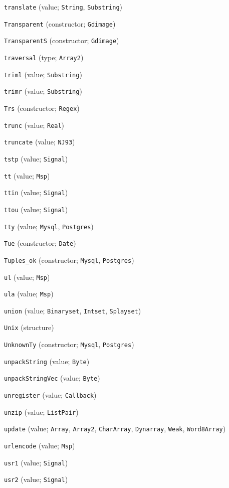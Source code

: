 \begin{description}
\item[] \verb"translate" (value; \verb"String", \verb"Substring")
\item[] \verb"Transparent" (constructor; \verb"Gdimage")
\item[] \verb"TransparentS" (constructor; \verb"Gdimage")
\item[] \verb"traversal" (type; \verb"Array2")
\item[] \verb"triml" (value; \verb"Substring")
\item[] \verb"trimr" (value; \verb"Substring")
\item[] \verb"Trs" (constructor; \verb"Regex")
\item[] \verb"trunc" (value; \verb"Real")
\item[] \verb"truncate" (value; \verb"NJ93")
\item[] \verb"tstp" (value; \verb"Signal")
\item[] \verb"tt" (value; \verb"Msp")
\item[] \verb"ttin" (value; \verb"Signal")
\item[] \verb"ttou" (value; \verb"Signal")
\item[] \verb"tty" (value; \verb"Mysql", \verb"Postgres")
\item[] \verb"Tue" (constructor; \verb"Date")
\item[] \verb"Tuples_ok" (constructor; \verb"Mysql", \verb"Postgres")
\\[2ex]

\item[] \verb"ul" (value; \verb"Msp")
\item[] \verb"ula" (value; \verb"Msp")
\item[] \verb"union" (value; \verb"Binaryset", \verb"Intset", \verb"Splayset")
\item[] \verb"Unix" (structure)
\item[] \verb"UnknownTy" (constructor; \verb"Mysql", \verb"Postgres")
\item[] \verb"unpackString" (value; \verb"Byte")
\item[] \verb"unpackStringVec" (value; \verb"Byte")
\item[] \verb"unregister" (value; \verb"Callback")
\item[] \verb"unzip" (value; \verb"ListPair")
\item[] \verb"update" (value; \verb"Array", \verb"Array2", \verb"CharArray", \verb"Dynarray", \verb"Weak", \verb"Word8Array")
\item[] \verb"urlencode" (value; \verb"Msp")
\item[] \verb"usr1" (value; \verb"Signal")
\item[] \verb"usr2" (value; \verb"Signal")
\\[2ex]


\end{description}
